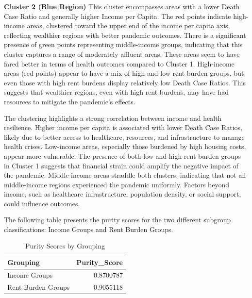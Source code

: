 \documentclass[
]{article}
\begin{document}
\vspace{5pt}

\textbf{Cluster 2 (Blue Region)} This cluster encompasses areas with a
lower Death Case Ratio and generally higher Income per Capita. The red
points indicate high-income areas, clustered toward the upper end of the
income per capita axis, reflecting wealthier regions with better
pandemic outcomes. There is a significant presence of green points
representing middle-income groups, indicating that this cluster captures
a range of moderately affluent areas. These areas seem to have fared
better in terms of health outcomes compared to Cluster 1. High-income
areas (red points) appear to have a mix of high and low rent burden
groups, but even those with high rent burdens display relatively low
Death Case Ratios. This suggests that wealthier regions, even with high
rent burdens, may have had resources to mitigate the pandemic's effects.

\vspace{5pt}

The clustering highlights a strong correlation between income and health
resilience. Higher income per capita is associated with lower Death Case
Ratios, likely due to better access to healthcare, resources, and
infrastructure to manage health crises. Low-income areas, especially
those burdened by high housing costs, appear more vulnerable. The
presence of both low and high rent burden groups in Cluster 1 suggests
that financial strain could amplify the negative impact of the pandemic.
Middle-income areas straddle both clusters, indicating that not all
middle-income regions experienced the pandemic uniformly. Factors beyond
income, such as healthcare infrastructure, population density, or social
support, could influence outcomes.

\vspace{5pt}

The following table presents the purity scores for the two different
subgroup classifications: Income Groups and Rent Burden Groups.

\begin{table}
\centering
\caption{\label{tab:purity calcuations}Purity Scores by Grouping}
\centering
\fontsize{10}{12}\selectfont
\begin{tabular}[t]{lr}
\toprule
Grouping & Purity\_Score\\
\midrule
Income Groups & 0.8700787\\
Rent Burden Groups & 0.9055118\\
\bottomrule
\end{tabular}
\end{table}
\end{document}
